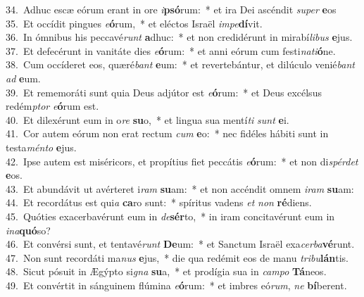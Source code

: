 {34.~}Adhuc escæ eórum erant in ore \textit{i}\textbf{psó}rum:~* et ira Dei ascéndit \textit{su}\textit{per} \textbf{e}os\\
{35.~}Et occídit pingues \textit{e}\textbf{ó}rum,~* et eléctos Israël \textit{im}\textit{pe}\textbf{dí}vit.\\
{36.~}In ómnibus his peccavé\textit{runt} \textbf{a}dhuc:~* et non credidérunt in mirabí\textit{li}\textit{bus} \textbf{e}jus.\\
{37.~}Et defecérunt in vanitáte dies \textit{e}\textbf{ó}rum:~* et anni eórum cum festi\textit{na}\textit{ti}\textbf{ó}ne.\\
{38.~}Cum occíderet eos, quæré\textit{bant} \textbf{e}um:~* et revertebántur, et dilúculo venié\textit{bant} \textit{ad} \textbf{e}um.\\
{39.~}Et rememoráti sunt quia Deus adjútor est \textit{e}\textbf{ó}rum:~* et Deus excélsus redém\textit{ptor} \textit{e}\textbf{ó}rum est.\\
{40.~}Et dilexérunt eum in o\textit{re} \textbf{su}o,~* et lingua sua mentí\textit{ti} \textit{sunt} \textbf{e}i.\\
{41.~}Cor autem eórum non erat rectum \textit{cum} \textbf{e}o:~* nec fidéles hábiti sunt in testa\textit{mén}\textit{to} \textbf{e}jus.\\
{42.~}Ipse autem est miséricors, et propítius fiet peccátis \textit{e}\textbf{ó}rum:~* et non di\textit{spér}\textit{det} \textbf{e}os.\\
{43.~}Et abundávit ut avérteret i\textit{ram} \textbf{su}am:~* et non accéndit omnem \textit{i}\textit{ram} \textbf{su}am:\\
{44.~}Et recordátus est qui\textit{a} \textbf{ca}ro sunt:~* spíritus vadens \textit{et} \textit{non} \textbf{ré}diens.\\
{45.~}Quóties exacerbavérunt eum in \textit{de}\textbf{sér}to,~* in iram concitavérunt eum in \textit{i}\textit{na}\textbf{quó}so?\\
{46.~}Et convérsi sunt, et tentavé\textit{runt} \textbf{De}um:~* et Sanctum Israël exa\textit{cer}\textit{ba}\textbf{vé}runt.\\
{47.~}Non sunt recordáti ma\textit{nus} \textbf{e}jus,~* die qua redémit eos de manu \textit{tri}\textit{bu}\textbf{lán}tis.\\
{48.~}Sicut pósuit in Ægýpto si\textit{gna} \textbf{su}a,~* et prodígia sua in \textit{cam}\textit{po} \textbf{Tá}neos.\\
{49.~}Et convértit in sánguinem flúmina \textit{e}\textbf{ó}rum:~* et imbres eó\textit{rum}, \textit{ne} \textbf{bí}berent.\\
